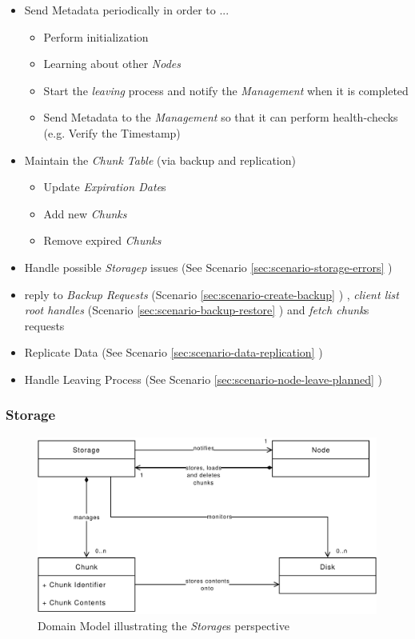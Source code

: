 \begin{itemize}
	\item Send Metadata periodically in order to ...
	\begin{itemize}
		\item Perform initialization
		\item Learning about other \emph{Nodes}
		\item Start the \emph{leaving} process and notify the \emph{Management} when it is completed
		\item Send Metadata to the \emph{Management} so that it can perform health-checks (e.g. Verify the Timestamp)
	\end{itemize}
	\item Maintain the \emph{Chunk Table} (via backup and replication)
	\begin{itemize}
		\item Update \emph{Expiration Date}s
		\item Add new \emph{Chunks}
		\item Remove expired \emph{Chunks}
	\end{itemize}
	\item Handle possible \emph{Storagep} issues (See Scenario \ref{sec:scenario-storage-errors} )
	\item reply to \emph{Backup Requests}  (Scenario \ref{sec:scenario-create-backup} ) , \emph{client list root handles} (Scenario \ref{sec:scenario-backup-restore} ) and \emph{fetch chunk}s requests
	\item Replicate Data (See Scenario \ref{sec:scenario-data-replication} )
	\item Handle Leaving Process (See Scenario \ref{sec:scenario-node-leave-planned} )
\end{itemize}

\label{sec:component-storage}
\subsubsection{Storage}

\begin{figure}[h]
    \centering
    \includegraphics[width=1\linewidth]{resources/storage_domain_model}
	\caption[Storage Domain Model]{Domain Model illustrating the \emph{Storage}s perspective}
\end{figure}

